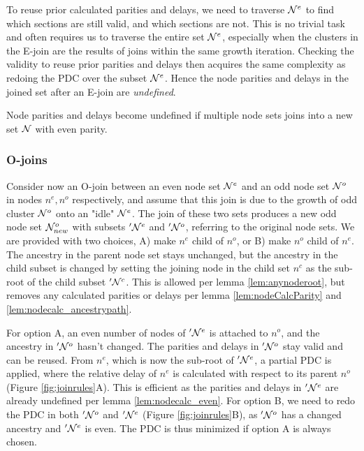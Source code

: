 To reuse prior calculated parities and delays, we need to traverse $\mathcal{N}^e$ to find which sections are still valid, and which sections are not. This is no trivial task and often requires us to traverse the entire set $\mathcal{N}^e$, especially when the clusters in the E-join are the results of joins within the same growth iteration.  Checking the validity to reuse prior parities and delays then acquires the same complexity as redoing the PDC over the subset $\mathcal{N}^e$. Hence the node parities and delays in the joined set after an E-join are \emph{undefined}.

\begin{lemma}\label{lem:nodecalc_even}
  Node parities and delays become undefined if multiple node sets joins into a new set $\mathcal{N}$ with even parity.
\end{lemma}

\subsubsection{O-joins}

Consider now an O-join between an even node set $\mathcal{N}^e$ and an odd node set $\mathcal{N}^o$ in nodes $n^e, n^o$ respectively, and assume that this join is due to the growth of odd cluster $\mathcal{N}^o$ onto an "idle" $\mathcal{N}^e$. The join of these two sets produces a new odd node set $\mathcal{N}_{new}^o$ with subsets $'\mathcal{N}^e$ and $'\mathcal{N}^o$, referring to the original node sets. We are provided with two choices, A) make $n^e$ child of $n^o$, or B) make $n^o$ child of $n^e$. The ancestry in the parent node set stays unchanged, but the ancestry in the child subset is changed by setting the joining node in the child set $n^c$ as the sub-root of the child subset $'\mathcal{N}^c$. This is allowed per lemma \ref{lem:anynoderoot}, but removes any calculated parities or delays per lemma \ref{lem:nodeCalcParity} and \ref{lem:nodecalc_ancestrypath}.

For option A, an even number of nodes of $'\mathcal{N}^e$ is attached to $n^o$, and the ancestry in $'\mathcal{N}^o$ hasn't changed. The parities and delays in $'\mathcal{N}^o$ stay valid and can be reused. From $n^e$, which is now the sub-root of  $'\mathcal{N}^e$, a partial PDC is applied, where the relative delay of $n^e$ is calculated with respect to its parent $n^o$ (Figure \ref{fig:joinrules}A). This is efficient as the parities and delays in $'\mathcal{N}^e$ are already undefined per lemma \ref{lem:nodecalc_even}. For option B, we need to redo the PDC in both $'\mathcal{N}^o$ and $'\mathcal{N}^e$ (Figure \ref{fig:joinrules}B), as $'\mathcal{N}^o$ has a changed ancestry and  $'\mathcal{N}^e$ is even. The PDC is thus minimized if option A is always chosen. \\

